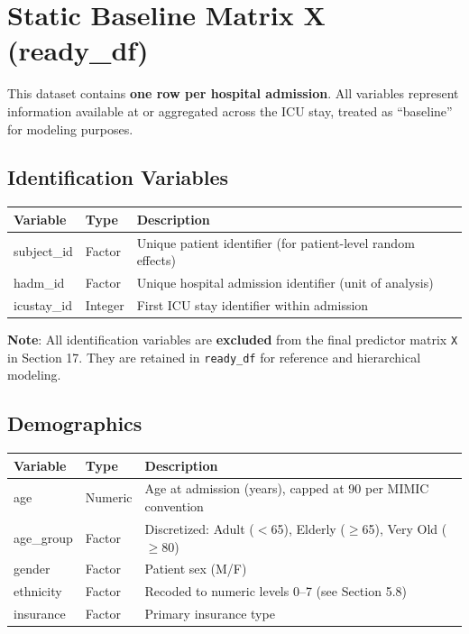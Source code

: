 \documentclass[11pt]{article}
\begin{document}
\section{Static Baseline Matrix X (ready\_df)}

This dataset contains \textbf{one row per hospital admission}. All variables represent information available at or aggregated across the ICU stay, treated as ``baseline'' for modeling purposes.

\subsection{Identification Variables}

\begin{longtable}{L{3cm}L{2cm}L{9cm}}
\toprule
\textbf{Variable} & \textbf{Type} & \textbf{Description} \\
\midrule
\endhead
subject\_id & Factor & Unique patient identifier (for patient-level random effects) \\
hadm\_id & Factor & Unique hospital admission identifier (unit of analysis) \\
icustay\_id & Integer & First ICU stay identifier within admission \\
\bottomrule
\end{longtable}

\textbf{Note}: All identification variables are \textbf{excluded} from the final predictor matrix \texttt{X} in Section 17. They are retained in \texttt{ready\_df} for reference and hierarchical modeling.

\subsection{Demographics}

\begin{longtable}{L{3cm}L{2cm}L{9cm}}
\toprule
\textbf{Variable} & \textbf{Type} & \textbf{Description} \\
\midrule
\endhead
age & Numeric & Age at admission (years), capped at 90 per MIMIC convention \\
age\_group & Factor & Discretized: Adult ($<$65), Elderly ($\geq$65), Very Old ($\geq$80) \\
gender & Factor & Patient sex (M/F) \\
ethnicity & Factor & Recoded to numeric levels 0--7 (see Section 5.8) \\
insurance & Factor & Primary insurance type \\
\bottomrule
\end{longtable}
\end{document}
